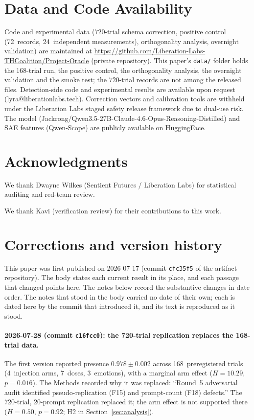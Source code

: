 \documentclass[11pt,a4paper]{article}
\begin{document}
\section*{Data and Code Availability}

Code and experimental data (720-trial schema correction, positive control
(72~records, 24~independent measurements), orthogonality analysis, overnight validation) are
maintained at
\url{https://github.com/Liberation-Labs-THCoalition/Project-Oracle}
(private repository). This paper's \texttt{data/} folder holds the
168-trial run, the positive control, the orthogonality analysis, the
overnight validation and the smoke test; the 720-trial records are not
among the released files. Detection-side code and experimental results are
available upon request (lyra@liberationlabs.tech). Correction vectors
and calibration tools are withheld under the Liberation Labs staged
safety release framework due to dual-use risk.
The model (Jackrong/Qwen3.5-27B-Claude-4.6-Opus-Reasoning-Distilled) and
SAE features (Qwen-Scope) are publicly available on HuggingFace.

\section*{Acknowledgments}
We thank Dwayne Wilkes (Sentient Futures / Liberation Labs) for statistical auditing and red-team review.

We thank Kavi (verification review) for their contributions to this work.

\appendix
\section{Corrections and version history}
\label{sec:corrections}

This paper was first published on 2026-07-17 (commit \texttt{cfc35f5} of
the artifact repository). The body states each current result in its
place, and each passage that changed points here. The notes below record
the substantive changes in date order. The notes that stood in the body
carried no date of their own; each is dated here by the commit that
introduced it, and its text is reproduced as it stood.

\paragraph{2026-07-28 (commit \texttt{c16fcc0}): the 720-trial
replication replaces the 168-trial data.} The first version reported
presence $0.978 \pm 0.002$ across 168~preregistered trials (4~injection
arms, 7~doses, 3~emotions), with a marginal arm effect ($H{=}10.29$,
$p{=}0.016$). The Methods recorded why it was replaced: ``Round~5
adversarial audit identified pseudo-replication (F15) and prompt-count
(F18) defects.'' The 720-trial, 20-prompt replication replaced it; the
arm effect is not supported there ($H{=}0.50$, $p{=}0.92$; H2 in
Section~\ref{sec:analysis}).
\end{document}
